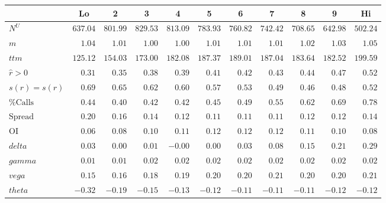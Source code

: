 \begin{tabular}{@{}lrrrrrrrrrr@{}}%
\toprule%
&\multicolumn{1}{c}{Lo}&\multicolumn{1}{c}{2}&\multicolumn{1}{c}{3}&\multicolumn{1}{c}{4}&\multicolumn{1}{c}{5}&\multicolumn{1}{c}{6}&\multicolumn{1}{c}{7}&\multicolumn{1}{c}{8}&\multicolumn{1}{c}{9}&\multicolumn{1}{c}{Hi}\\%
\midrule%
$N^{U}$&$637.04$&$801.99$&$829.53$&$813.09$&$783.93$&$760.82$&$742.42$&$708.65$&$642.98$&$502.24$\\%
$m$&$1.04$&$1.01$&$1.00$&$1.00$&$1.01$&$1.01$&$1.01$&$1.02$&$1.03$&$1.05$\\%
$ttm$&$125.12$&$154.03$&$173.00$&$182.08$&$187.37$&$189.01$&$187.04$&$183.64$&$182.52$&$199.59$\\%
$\hat{r}>0$&$0.31$&$0.35$&$0.38$&$0.39$&$0.41$&$0.42$&$0.43$&$0.44$&$0.47$&$0.52$\\%
$s(r)=s(\hat{r})$&$0.69$&$0.65$&$0.62$&$0.60$&$0.57$&$0.53$&$0.49$&$0.46$&$0.48$&$0.52$\\%
$\text{\% Calls}$&$0.44$&$0.40$&$0.42$&$0.42$&$0.45$&$0.49$&$0.55$&$0.62$&$0.69$&$0.78$\\%
$\text{Spread}$&$0.20$&$0.16$&$0.14$&$0.12$&$0.11$&$0.11$&$0.11$&$0.12$&$0.12$&$0.14$\\%
$\text{OI}$&$0.06$&$0.08$&$0.10$&$0.11$&$0.12$&$0.12$&$0.12$&$0.11$&$0.10$&$0.08$\\%
$delta$&$0.03$&$0.00$&$0.01$&$-0.00$&$0.00$&$0.03$&$0.08$&$0.15$&$0.21$&$0.29$\\%
$gamma$&$0.01$&$0.01$&$0.02$&$0.02$&$0.02$&$0.02$&$0.02$&$0.02$&$0.02$&$0.02$\\%
$vega$&$0.15$&$0.16$&$0.18$&$0.19$&$0.20$&$0.20$&$0.21$&$0.20$&$0.20$&$0.21$\\%
$theta$&$-0.32$&$-0.19$&$-0.15$&$-0.13$&$-0.12$&$-0.11$&$-0.11$&$-0.11$&$-0.12$&$-0.12$\\\bottomrule%
%
\end{tabular}
